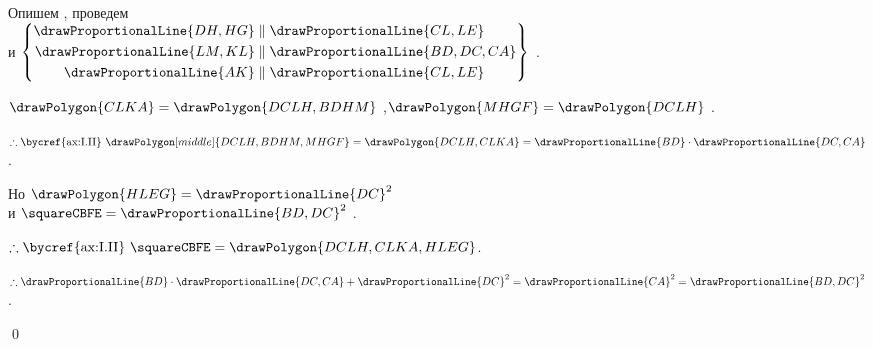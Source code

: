 \documentclass{byrne-book}
\begin{document}
\begin{center}
Опишем  , проведем \\
и $\left\{
\begin{aligned}
	\drawProportionalLine{DH,HG} & \parallel \drawProportionalLine{CL,LE} \\
	\drawProportionalLine{LM,KL} & \parallel \drawProportionalLine{BD,DC,CA} \\
	\drawProportionalLine{AK} & \parallel \drawProportionalLine{CL,LE} \\
\end{aligned}
\right\}$ .

$\drawPolygon{CLKA} = \drawPolygon{DCLH,BDHM}$ ,$\drawPolygon{MHGF} = \drawPolygon{DCLH}$ .

$\therefore \mbox{\bycref{ax:I.II} } \drawPolygon[middle]{DCLH,BDHM,MHGF} = \drawPolygon{DCLH,CLKA} = \drawProportionalLine{BD} \cdot \drawProportionalLine{DC,CA}$.

Но $\drawPolygon{HLEG} = \drawProportionalLine{DC}^2$ \\
и $\squareCBFE = \drawProportionalLine{BD,DC}^2$ \bycref{\constref}.

$\therefore \mbox{\bycref{ax:I.II} } \squareCBFE = \drawPolygon{DCLH,CLKA,HLEG}$.

$\therefore \drawProportionalLine{BD} \cdot \drawProportionalLine{DC,CA} + \drawProportionalLine{DC}^2 = \drawProportionalLine{CA}^2 = \drawProportionalLine{BD,DC}^2$.
\end{center}

\qed
\end{document}
